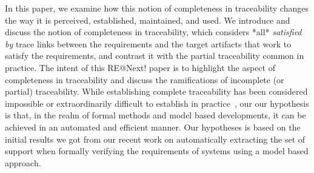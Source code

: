 In this paper, we examine how this notion of completeness in traceability changes the way it is perceived, established, maintained, and used. We introduce and discuss the notion of completeness in traceability, which considers *all* \emph{satisfied by} trace links between the requirements and the target artifacts that work to satisfy the requirements, and contrast it with the partial traceability common in practice.  The intent of this RE@Next! paper is to highlight the aspect of completeness in traceability and discuss the ramifications of incomplete (or partial) traceability. While establishing complete traceability has been considered impossible or extraordinarily difficult to establish in practice~\cite{stravsunskas2002traceability}, our our hypothesis is that, in the realm of formal methods and model based developments, it can be achieved in an automated and efficient manner. Our hypotheses is based on the initial results we got from our recent work on automatically extracting the set of support when formally verifying the requirements of systems using a model based approach.
